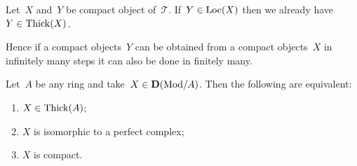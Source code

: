 \documentclass[10pt,a4paper]{article}
\begin{document}
\begin{proposition}
  Let~$X$ and~$Y$ be compact object of~$\mathcal{T}$. If~$Y\in\operatorname{Loc}(X)$ then we already have~$Y\in\operatorname{Thick}(X)$.
\end{proposition}
Hence if a compact objects~$Y$ can be obtained from a compact objects~$X$ in infinitely many steps it can also be done in finitely many.
\begin{example}
  Let~$A$ be any ring and take~$X\in\mathbf{D}(\mathrm{Mod}/A)$. Then the following are equivalent:
  \begin{enumerate}
    \item $X\in\operatorname{Thick}(A)$;
    \item $X$ is isomorphic to a perfect complex;
    \item $X$ is compact.
  \end{enumerate}
\end{example}
\end{document}
